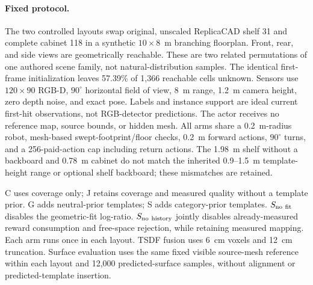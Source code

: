 \paragraph{Fixed protocol.}
The two controlled layouts swap original, unscaled ReplicaCAD shelf 31 and complete cabinet 118 in a synthetic $10\times8$~m branching floorplan. Front, rear, and side views are geometrically reachable. These are two related permutations of one authored scene family, not natural-distribution samples. The identical first-frame initialization leaves 57.39\% of 1,366 reachable cells unknown. Sensors use $120\times90$ RGB-D, $90^{\circ}$ horizontal field of view, 8~m range, 1.2~m camera height, zero depth noise, and exact pose. Labels and instance support are ideal current first-hit observations, not RGB-detector predictions. The actor receives no reference map, source bounds, or hidden mesh. All arms share a 0.2~m-radius robot, mesh-based swept-footprint/floor checks, 0.2~m forward actions, $90^{\circ}$ turns, and a 256-paid-action cap including return actions. The 1.98~m shelf without a backboard and 0.78~m cabinet do not match the inherited 0.9--1.5~m template-height range or optional shelf backboard; these mismatches are retained.

C uses coverage only; J retains coverage and measured quality without a template prior. G adds neutral-prior templates; S adds category-prior templates. $S_{\rm no\ fit}$ disables the geometric-fit log-ratio. $S_{\rm no\ history}$ jointly disables already-measured reward consumption and free-space rejection, while retaining measured mapping. Each arm runs once in each layout. TSDF fusion uses 6~cm voxels and 12~cm truncation. Surface evaluation uses the same fixed visible source-mesh reference within each layout and 12,000 predicted-surface samples, without alignment or predicted-template insertion.

\clearpage


